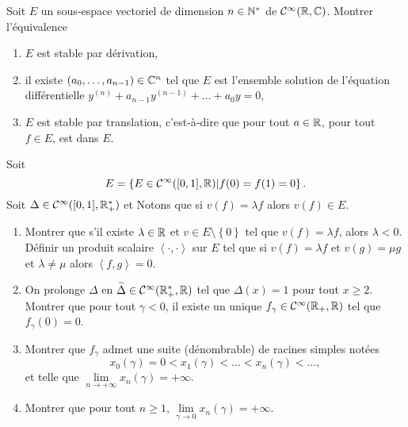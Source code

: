 \documentclass[12pt]{article}
\begin{document}
\begin{exercise}
	Soit $E$ un sous-espace vectoriel de dimension $n\in\mathbb{N}^{*}$ de $\mathcal{C}^{\infty}(\mathbb{R},\mathbb{C})$. Montrer l'équivalence
	\begin{enumerate}[label=(\roman*)]
		\item $E$ est stable par dérivation,
		\item il existe $(a_{0},\dots,a_{n-1})\in\mathbb{C}^{n}$ tel que $E$ est l'ensemble solution de l'équation différentielle $y^{(n)}+a_{n-1}y^{(n-1)}+\dots+a_{0}y=0$,
		\item $E$ est stable par translation, c'est-à-dire que pour tout $a\in\mathbb{R}$, pour tout $f\in E$,  est dans $E$.
	\end{enumerate}
\end{exercise}

\begin{exercise}
	Soit \begin{equation*}
		E=\left\lbrace E\in\mathcal{C}^{\infty}([0,1],\mathbb{R})\middle| f(0)=f(1)=0\right\rbrace.
	\end{equation*}
	Soit $\Delta\in\mathcal{C}^{\infty}([0,1],\mathbb{R}_{+}^{*})$ et 
	Notons que si $v(f)=\lambda f$ alors $v(f)\in E$.
	\begin{enumerate}
		\item Montrer que s'il existe $\lambda\in\mathbb{R}$ et $v\in E\setminus\left\lbrace 0\right\rbrace$ tel que $v(f)=\lambda f$, alors $\lambda<0$. Définir un produit scalaire $\left\langle\cdot,\cdot\right\rangle$ sur $E$ tel que si $v(f)=\lambda f$ et $v(g)=\mu g$ et $\lambda\neq \mu$ alors $\left\langle f,g\right\rangle=0$.
		\item On prolonge $\Delta$ en $\widetilde{\Delta}\in\mathcal{C}^{\infty}(\mathbb{R}_{+}^{*},\mathbb{R})$ tel que $\Delta(x)=1$ pour tout $x\geqslant2$. Montrer que pour tout $\gamma<0$, il existe un unique $f_{\gamma}\in\mathcal{C}^{\infty}(\mathbb{R}_{+},\mathbb{R})$ tel que $f_{\gamma}(0)=0$.
		\item Montrer que $f_{\gamma}$ admet une suite (dénombrable) de racines simples notées 
		\begin{equation*}
			x_{0}(\gamma)=0<x_{1}(\gamma)<\dots<x_{n}(\gamma)<\dots,
		\end{equation*}
		et telle que $\lim\limits_{n\to+\infty}x_n(\gamma)=+\infty$.

		\item Montrer que pour tout $n\geqslant1$, $\lim\limits_{\gamma\to0}x_n(\gamma)=+\infty$.
	\end{enumerate}
\end{exercise}
\end{document}
